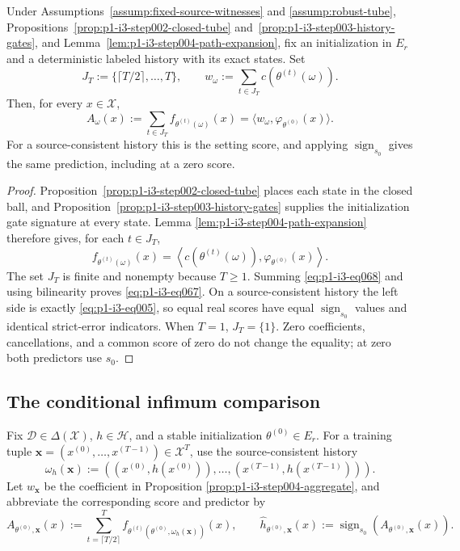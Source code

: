 \begin{proposition}
\label{prop:p1-i3-step004-aggregate}
Under Assumptions~\ref{assump:fixed-source-witnesses} and
\ref{assump:robust-tube}, Propositions~\ref{prop:p1-i3-step002-closed-tube}
and~\ref{prop:p1-i3-step003-history-gates}, and
Lemma~\ref{lem:p1-i3-step004-path-expansion}, fix an initialization in $E_r$
and a deterministic labeled history with its exact states.  Set
\[
J_T:=\{\lceil T/2\rceil,\ldots,T\},
\qquad
w_\omega:=\sum_{t\in J_T}c(\theta^{(t)}(\omega)).
\tag{66}\label{eq:p1-i3-eq066}
\]
Then, for every $x\in\mathcal X$,
\[
A_\omega(x):=\sum_{t\in J_T}f_{\theta^{(t)}(\omega)}(x)
=\langle w_\omega,\varphi_{\theta^{(0)}}(x)\rangle.
\tag{67}\label{eq:p1-i3-eq067}
\]
For a source-consistent history this is the setting score, and applying
$\operatorname{sign}_{s_0}$ gives the same prediction, including at a zero
score.
\end{proposition}

\begin{proof}
Proposition~\ref{prop:p1-i3-step002-closed-tube} places each state in the
closed ball, and Proposition~\ref{prop:p1-i3-step003-history-gates} supplies
the initialization gate signature at every state.  Lemma
\ref{lem:p1-i3-step004-path-expansion} therefore gives, for each $t\in J_T$,
\[
f_{\theta^{(t)}(\omega)}(x)
=\left\langle c(\theta^{(t)}(\omega)),
\varphi_{\theta^{(0)}}(x)\right\rangle.
\tag{68}\label{eq:p1-i3-eq068}
\]
The set $J_T$ is finite and nonempty because $T\geq1$.  Summing \eqref{eq:p1-i3-eq068} and
using bilinearity proves \eqref{eq:p1-i3-eq067}.  On a source-consistent history the left side
is exactly \eqref{eq:p1-i3-eq005}, so equal real scores have equal
$\operatorname{sign}_{s_0}$ values and identical strict-error indicators.
When $T=1$, $J_T=\{1\}$.  Zero coefficients, cancellations, and a common score
of zero do not change the equality; at zero both predictors use $s_0$.
\end{proof}

\subsection{The conditional infimum comparison}
\label{app:step005-risk}

Fix $\mathcal D\in\Delta(\mathcal X)$, $h\in\mathcal H$, and a stable
initialization $\theta^{(0)}\in E_r$.  For a training tuple
$\mathbf x=(x^{(0)},\ldots,x^{(T-1)})\in\mathcal X^T$, use the source-consistent
history
\[
\omega_h(\mathbf x):=((x^{(0)},h(x^{(0)})),\ldots,
(x^{(T-1)},h(x^{(T-1)}))).
\tag{69}\label{eq:p1-i3-eq069}
\]
Let $w_{\mathbf x}$ be the coefficient in Proposition
\ref{prop:p1-i3-step004-aggregate}, and abbreviate the corresponding score and
predictor by
\[
A_{\theta^{(0)},\mathbf x}(x):=
\sum_{t=\lceil T/2\rceil}^{T}
f_{\theta^{(t)}(\theta^{(0)},\omega_h(\mathbf x))}(x),
\qquad
\widehat h_{\theta^{(0)},\mathbf x}(x):=
\operatorname{sign}_{s_0}(A_{\theta^{(0)},\mathbf x}(x)).
\tag{70}\label{eq:p1-i3-eq070}
\]

